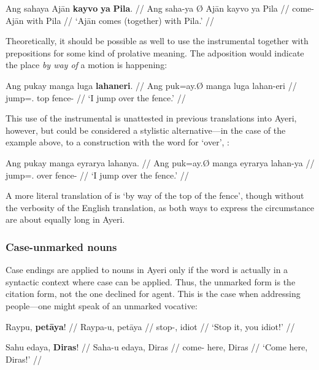 \ex\begingl
	\gla Ang sahaya {} Ajān \textbf{kayvo} \textbf{ya} \textbf{Pila}. //
	\glb Ang saha-ya Ø Ajān kayvo ya Pila //
	\glc \AgtT{} come-\TsgM{} \Top{} Ajān with \Loc{} Pila //
	\glft `Ajān comes (together) with Pila.' //
\endgl\xe

Theoretically, it should be possible as well to use the instrumental together 
with prepositions for some kind of prolative meaning. The adposition would 
indicate the place \emph{by way of} a motion is happening:

\ex\begingl
	\gla Ang pukay manga luga \textbf{lahaneri}. //
	\glb Ang puk=ay.Ø manga luga lahan-eri //
	\glc \AgtT{} jump=\Fsg{}.\Top{} \Dyn{} top fence-\Ins{} //
	\glft `I jump over the fence.' //
\endgl\xe

This use of the instrumental is unattested in previous translations into Ayeri,
however, but could be considered a stylistic alternative---in the case of the
example above, to a construction with the word for `over',
:

\ex\begingl
	\gla Ang pukay manga eyrarya lahanya. //
	\glb Ang puk=ay.Ø manga eyrarya lahan-ya //
	\glc \AgtT{} jump=\Fsg{}.\Top{} \Dyn{} over fence-\Loc{} //
	\glft `I jump over the fence.' //
\endgl\xe

A more literal translation of  is `by
way of the top of the fence', though without the verbosity of the English
translation, as both ways to express the circumstance are about equally long in
Ayeri.


\subsubsection{Case-unmarked nouns}
\label{subsec:uncased}

Case endings are applied to nouns in Ayeri only if the word is actually in a
syntactic context where case can be applied. Thus, the unmarked form is the
citation form, not the one declined for agent. This is the case when addressing
people---one might speak of an unmarked vocative:

\pex
\a\label{ex:vocnoun}\begingl
	\gla Raypu, \textbf{petāya}! //
	\glb Raypa-u, petāya //
	\glc stop-\Imp{}, idiot //
	\glft `Stop it, you idiot!' //
\endgl

\a\label{ex:vocname}\begingl
	\gla Sahu edaya, \textbf{Diras}! //
	\glb Saha-u edaya, Diras //
	\glc come-\Imp{} here, Diras //
	\glft `Come here, Diras!' //
\endgl
\xe

